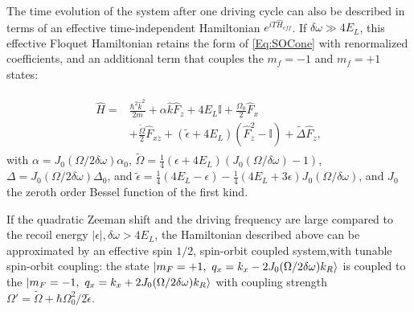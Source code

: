 
The time evolution of the system after one driving cycle can also be described in terms of an effective time-independent Hamiltonian $e^{iT\hat{H}_{eff}}$. If $\delta\omega \gg 4E_L$, this effective Floquet Hamiltonian retains the form of \ref{Eq:SOCone} with renormalized coefficients, and an additional term that couples the $m_f=-1$ and $m_f=+1$ states:

\begin{align}
	\begin{split}
		\hat{H} = &\frac{\hbar^2\hat{k}^2}{2m} + \alpha\hat{k}\hat{F}_z +4E_L\mathbb{I} + \frac{\Omega_0}{2}\hat{F}_x \\
		&+ \frac{\tilde{\Omega}}{2}\hat{F}_{xz} +(\tilde{\epsilon}+4E_L)(\hat{F}_z^2-\mathbb{I}) +\tilde{\Delta}\hat{F}_z, 
		\label{Eq:SOCeff}
	\end{split}
\end{align}	
%
with $\alpha= J_0(\Omega/2\delta\omega)\alpha_0$, $\tilde{\Omega}=\frac{1}{4}(\epsilon+4E_L) (J_0(\Omega/\delta\omega)-1)$, $\Delta=J_0(\Omega/2\delta\omega)\Delta_0$, and $\tilde{\epsilon}= \frac{1}{4}(4E_L-\epsilon) - 
\frac{1}{4}(4E_L + 3 \epsilon) J_0( \Omega/\delta\omega)$, and $J_0$ the zeroth order Bessel function of the first kind.

If the quadratic Zeeman shift and the driving frequency are large compared to the recoil energy $|\epsilon|, \delta\omega >4E_L$, the Hamiltonian described above can be approximated by an effective spin $1/2$, spin-orbit coupled system,with tunable spin-orbit coupling: the state $\ket{m_F=+1,\ q_x=k_x-2J_0(\Omega/2\delta\omega)k_R}$ is coupled to the $\ket{m_F=-1,\ q_x=k_x+2J_0(\Omega/2\delta\omega)k_R}$ with coupling strength  $\Omega'=\tilde{\Omega}+\hbar\Omega_0^2/2\tilde{\epsilon}$\cite{l._j._leblanc_direct_2013}.

